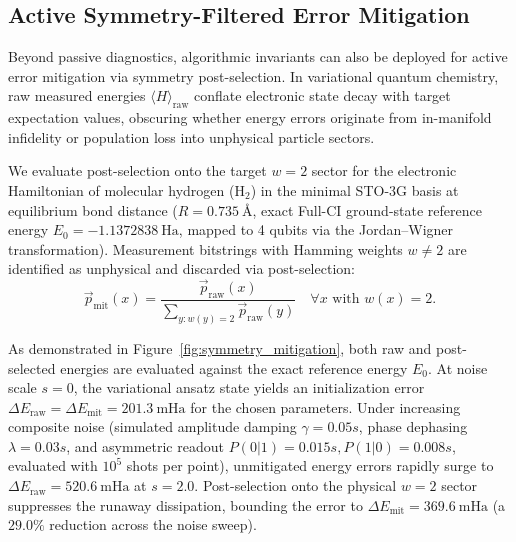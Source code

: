 \documentclass[aps,pra,reprint,superscriptaddress,floatfix,nofootinbib]{revtex4-2}
\begin{document}
\subsection{Active Symmetry-Filtered Error Mitigation}
Beyond passive diagnostics, algorithmic invariants can also be deployed for active error mitigation via symmetry post-selection. In variational quantum chemistry, raw measured energies $\langle H \rangle_{\text{raw}}$ conflate electronic state decay with target expectation values, obscuring whether energy errors originate from in-manifold infidelity or population loss into unphysical particle sectors.

We evaluate post-selection onto the target $w = 2$ sector for the electronic Hamiltonian of molecular hydrogen ($\mathrm{H}_2$) in the minimal STO-3G basis at equilibrium bond distance ($R = 0.735\ \text{\AA}$, exact Full-CI ground-state reference energy $E_0 = -1.1372838\ \text{Ha}$, mapped to 4 qubits via the Jordan--Wigner transformation). Measurement bitstrings with Hamming weights $w \neq 2$ are identified as unphysical and discarded via post-selection:
\begin{equation}
\vec{p}_{\text{mit}}(x) = \frac{\vec{p}_{\text{raw}}(x)}{\sum_{y: w(y)=2} \vec{p}_{\text{raw}}(y)} \quad \forall x \text{ with } w(x) = 2.
\end{equation}

As demonstrated in Figure~\ref{fig:symmetry_mitigation}, both raw and post-selected energies are evaluated against the exact reference energy $E_0$. At noise scale $s = 0$, the variational ansatz state yields an initialization error $\Delta E_{\text{raw}} = \Delta E_{\text{mit}} = 201.3\ \text{mHa}$ for the chosen parameters. Under increasing composite noise (simulated amplitude damping $\gamma = 0.05s$, phase dephasing $\lambda = 0.03s$, and asymmetric readout $P(0|1) = 0.015s, P(1|0) = 0.008s$, evaluated with $10^5$ shots per point), unmitigated energy errors rapidly surge to $\Delta E_{\text{raw}} = 520.6\ \text{mHa}$ at $s = 2.0$. Post-selection onto the physical $w = 2$ sector suppresses the runaway dissipation, bounding the error to $\Delta E_{\text{mit}} = 369.6\ \text{mHa}$ (a $29.0\%$ reduction across the noise sweep).
\end{document}
